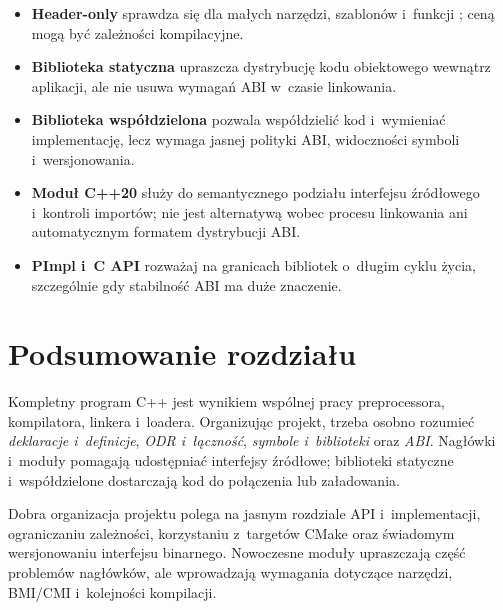 \begin{itemize}
\item \textbf{Header-only} sprawdza się dla małych narzędzi, szablonów
      i~funkcji ; ceną mogą być zależności kompilacyjne.
\item \textbf{Biblioteka statyczna} upraszcza dystrybucję kodu obiektowego
      wewnątrz aplikacji, ale nie usuwa wymagań ABI w~czasie linkowania.
\item \textbf{Biblioteka współdzielona} pozwala współdzielić kod
      i~wymieniać implementację, lecz wymaga jasnej polityki ABI,
      widoczności symboli i~wersjonowania.
\item \textbf{Moduł C++20} służy do semantycznego podziału interfejsu
      źródłowego i~kontroli importów; nie jest alternatywą wobec
      procesu linkowania ani automatycznym formatem dystrybucji ABI.
\item \textbf{PImpl i~C API} rozważaj na granicach bibliotek o~długim
      cyklu życia, szczególnie gdy stabilność ABI ma duże znaczenie.
\end{itemize}

\section*{Podsumowanie rozdziału}

Kompletny program C++ jest wynikiem wspólnej pracy preprocessora,
kompilatora, linkera i~loadera. Organizując projekt, trzeba osobno
rozumieć \emph{deklaracje i~definicje}, \emph{ODR i~łączność},
\emph{symbole i~biblioteki} oraz \emph{ABI}. Nagłówki i~moduły
pomagają udostępniać interfejsy źródłowe; biblioteki statyczne
i~współdzielone dostarczają kod do połączenia lub załadowania.

Dobra organizacja projektu polega na jasnym rozdziale API i~implementacji,
ograniczaniu zależności, korzystaniu z~targetów CMake oraz świadomym
wersjonowaniu interfejsu binarnego. Nowoczesne moduły upraszczają część
problemów nagłówków, ale wprowadzają wymagania dotyczące narzędzi,
BMI/CMI i~kolejności kompilacji.

